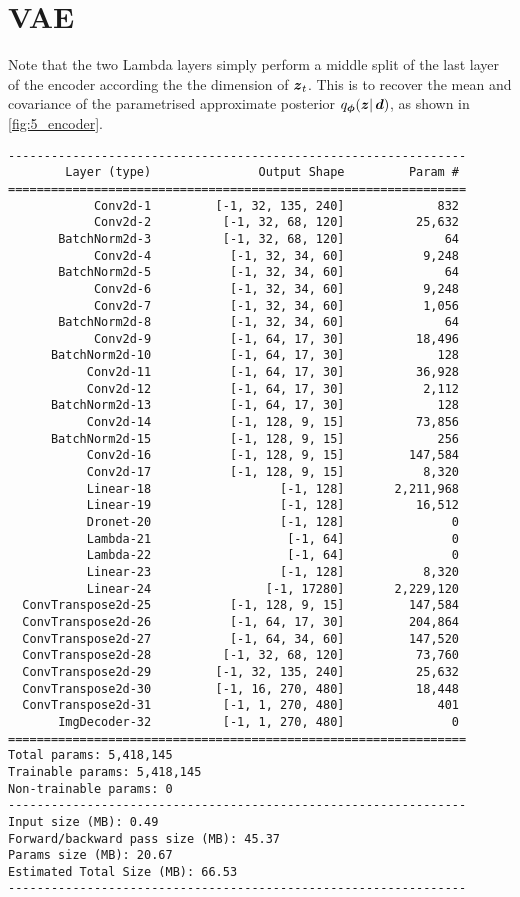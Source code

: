 \section{VAE}
Note that the two Lambda layers simply perform a middle split of the last layer of the encoder according the the dimension of ${\boldsymbol{z}}_t$. This is to recover the mean and covariance of the parametrised approximate posterior $q_{\boldsymbol{\phi}}(\boldsymbol{z} |\, {\boldsymbol{d}})$, as shown in \cref{fig:5_encoder}.
\begin{verbatim}
----------------------------------------------------------------
        Layer (type)               Output Shape         Param #
================================================================
            Conv2d-1         [-1, 32, 135, 240]             832
            Conv2d-2          [-1, 32, 68, 120]          25,632
       BatchNorm2d-3          [-1, 32, 68, 120]              64
            Conv2d-4           [-1, 32, 34, 60]           9,248
       BatchNorm2d-5           [-1, 32, 34, 60]              64
            Conv2d-6           [-1, 32, 34, 60]           9,248
            Conv2d-7           [-1, 32, 34, 60]           1,056
       BatchNorm2d-8           [-1, 32, 34, 60]              64
            Conv2d-9           [-1, 64, 17, 30]          18,496
      BatchNorm2d-10           [-1, 64, 17, 30]             128
           Conv2d-11           [-1, 64, 17, 30]          36,928
           Conv2d-12           [-1, 64, 17, 30]           2,112
      BatchNorm2d-13           [-1, 64, 17, 30]             128
           Conv2d-14           [-1, 128, 9, 15]          73,856
      BatchNorm2d-15           [-1, 128, 9, 15]             256
           Conv2d-16           [-1, 128, 9, 15]         147,584
           Conv2d-17           [-1, 128, 9, 15]           8,320
           Linear-18                  [-1, 128]       2,211,968
           Linear-19                  [-1, 128]          16,512
           Dronet-20                  [-1, 128]               0
           Lambda-21                   [-1, 64]               0
           Lambda-22                   [-1, 64]               0
           Linear-23                  [-1, 128]           8,320
           Linear-24                [-1, 17280]       2,229,120
  ConvTranspose2d-25           [-1, 128, 9, 15]         147,584
  ConvTranspose2d-26           [-1, 64, 17, 30]         204,864
  ConvTranspose2d-27           [-1, 64, 34, 60]         147,520
  ConvTranspose2d-28          [-1, 32, 68, 120]          73,760
  ConvTranspose2d-29         [-1, 32, 135, 240]          25,632
  ConvTranspose2d-30         [-1, 16, 270, 480]          18,448
  ConvTranspose2d-31          [-1, 1, 270, 480]             401
       ImgDecoder-32          [-1, 1, 270, 480]               0
================================================================
Total params: 5,418,145
Trainable params: 5,418,145
Non-trainable params: 0
----------------------------------------------------------------
Input size (MB): 0.49
Forward/backward pass size (MB): 45.37
Params size (MB): 20.67
Estimated Total Size (MB): 66.53
----------------------------------------------------------------
\end{verbatim}
